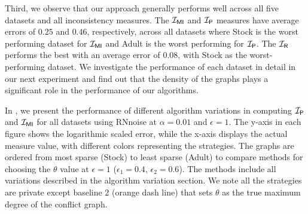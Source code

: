 Third, we observe that our approach generally performs well across all five datasets and all inconsistency measures. The $\mathcal{I_{\mathsf{MI}}}$ and $\mathcal{I_\mathsf{P}}$ measures have average errors of $0.25$ and $0.46$, respectively, across all datasets where Stock is the worst performing dataset for $\mathcal{I_{\mathsf{MI}}}$ and Adult is the worst performing for $\mathcal{I_\mathsf{P}}$. The $\mathcal{I_\mathsf{R}}$ performs the best with an average error of $0.08$, with Stock as the worst-performing dataset. We investigate the performance of each dataset in detail in our next experiment and find out that the density of the graphs plays a significant role in the performance of our algorithms. 




In , we present the performance of different algorithm variations in computing $\mathcal{I_\mathsf{P}}$ and $\mathcal{I_{\mathsf{MI}}}$ for all datasets using RNnoise at $\alpha=0.01$ and $\epsilon=1$. The y-axis in each figure shows the logarithmic scaled error, while the x-axis displays the actual measure value, with different colors representing the strategies. The graphs are ordered from most sparse (Stock) to least sparse (Adult) to compare methods for choosing the $\theta$ value at $\epsilon = 1$ ($\epsilon_1 = 0.4$, $\epsilon_2=0.6$). The methods include all variations described in the algorithm variation section.
We note all the strategies are private except baseline 2 (orange dash line) that sets $\theta$ as the true maximum degree of the conflict graph. 

